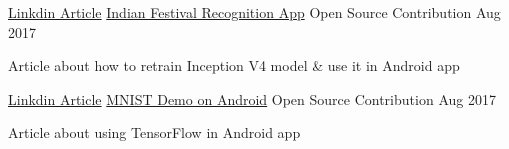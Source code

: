 \begin{cventries}
  \cventry
    {\href{https://goo.gl/LhiUZF}{Linkdin Article}} %
    {\href{https://goo.gl/LhiUZF}{Indian Festival Recognition App}} %
    {Open Source Contribution} %
    {Aug 2017} %
    {
      \begin{cvitems} %
        \item {Article about how to retrain Inception V4 model \& use it in Android app}
      \end{cvitems}
    }

    \cventry
    {\href{https://goo.gl/AQ9CXM}{Linkdin Article}} %
    {\href{https://goo.gl/AQ9CXM}{MNIST Demo on Android}} %
    {Open Source Contribution} %
    {Aug 2017} %
    {
      \begin{cvitems} %
        \item {Article about using TensorFlow in Android app} 
      \end{cvitems}
    }










\end{cventries}
